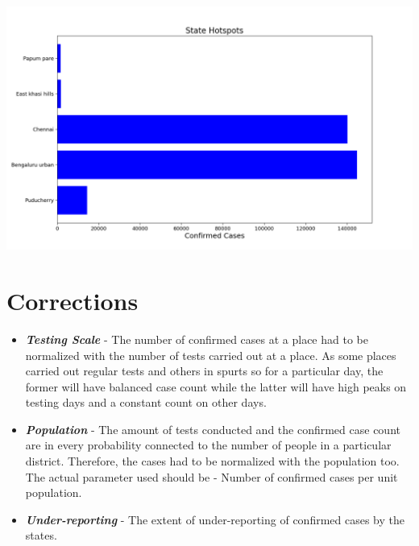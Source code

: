 \documentclass[11pt]{article}
\begin{document}
\begin{enumerate}
\begin{flushleft}
\includegraphics[width=\linewidth]{hot-state.png}

\end{flushleft}

\end{enumerate}

\section{Corrections}

\begin{itemize}
\item \textbf{\textit{Testing Scale}} - The number of confirmed cases at a place had to be normalized with the number of tests carried out at a place. As some places carried out regular tests and others in spurts so for a particular day, the former will have balanced case count while the latter will have high peaks on testing days and a constant count on other days.

\item \textbf{\textit{Population}} -  The amount of tests conducted and the confirmed case count are in every probability connected to the number of people in a particular district. Therefore, the cases had to be normalized with the population too. The actual parameter used should be - Number of confirmed cases per unit population.

\item \textbf{\textit{Under-reporting}} - The extent of under-reporting of confirmed cases by the states.
\end{itemize}
\end{document}
